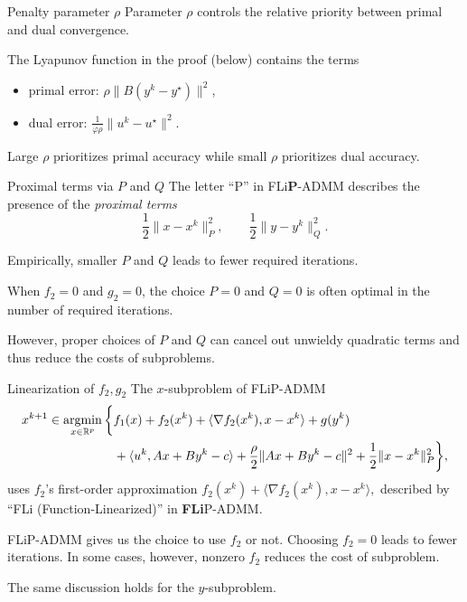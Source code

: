 \documentclass[10pt,mathserif]{beamer}
\begin{document}
\begin{frame}{Penalty parameter $\rho$}
Parameter $\rho$ controls the relative priority between primal and dual convergence.
\bigskip

The Lyapunov function in the proof (below) contains the terms
\begin{itemize}
  \item primal error: $\rho\|B(y^k-y^\star)\|^2$,
  \item dual error: $\frac{1}{\varphi\rho} \|u^k-u^\star\|^2$.
\end{itemize}
\bigskip

Large $\rho$ prioritizes primal accuracy while small $\rho$ prioritizes dual accuracy.
\end{frame}


\begin{frame}{Proximal terms via $P$ and $Q$}
The letter ``P'' in FLi\textbf{P}-ADMM describes the presence of the \emph{proximal terms}
\[
\frac{1}{2}\|x-x^k\|_P^2,\qquad
\frac{1}{2}\|y-y^k\|_Q^2.
\]
\medskip

Empirically, smaller $P$ and $Q$ leads to fewer required iterations.
\bigskip

When $f_2=0$ and $g_2=0$, the choice $P=0$ and $Q=0$ is often optimal in the number of required iterations.
\bigskip

However, proper choices of $P$ and $Q$ can cancel out unwieldy quadratic terms and thus reduce the costs of subproblems.

\end{frame}

\begin{frame}{Linearization of $f_2,g_2$}
The $x$-subproblem of FLiP-ADMM
\begin{align*}
x^{k+1} \in \operatorname*{argmin}_{x\in \mathbb{R}^p} \bigg\{&f_1(x) +
f_2(x^k)+\langle \nabla f_2(x^k) , x-x^k\rangle +g(y^k)\\
&+\langle u^k, Ax+By^k-c\rangle + \frac{\rho}{2}\|Ax+By^k-c\|^2 + \frac{1}{2}\|x-x^k\|_P^2\bigg\},
\end{align*}
uses $f_2$'s first-order approximation 
$f_2(x^k)+\langle \nabla f_2(x^k) , x-x^k\rangle,$
described by ``FLi (Function-Linearized)'' in \textbf{FLi}P-ADMM.
\bigskip

FLiP-ADMM gives us the choice to use $f_2$ or not. Choosing $f_2=0$ leads to fewer iterations. In some cases, however, nonzero $f_2$ reduces the cost of subproblem.
\bigskip

The same discussion holds for the $y$-subproblem.
\end{frame}
\end{document}
